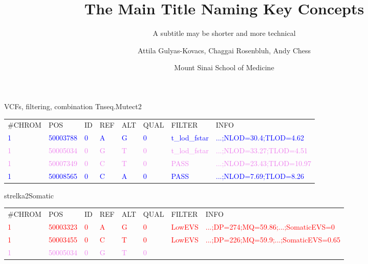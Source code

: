 \documentclass{beamer}
\title{The Main Title Naming Key Concepts}
\subtitle{A subtitle may be shorter and more technical}
\author{Attila Gulyas-Kovacs, Chaggai Rosenbluh, Andy Chess}
\date{Mount Sinai School of Medicine}
\begin{document}
\maketitle

\begin{frame}{VCFs, filtering, combination}
\normalsize
Tnseq.Mutect2
\tiny
\begin{tabular}{llllllll}
\#CHROM & POS & ID & REF & ALT & QUAL & FILTER & INFO \\
\textcolor{blue}{1} &
\textcolor{blue}{50003788} &
\textcolor{blue}{0} &
\textcolor{blue}{A} &
\textcolor{blue}{G} &
\textcolor{blue}{0} &
\textcolor{blue}{t\_lod\_fstar} &
\textcolor{blue}{...;NLOD=30.4;TLOD=4.62} \\
\textcolor{violet}{1} &
\textcolor{violet}{50005034} &
\textcolor{violet}{0} &
\textcolor{violet}{G} &
\textcolor{violet}{T} &
\textcolor{violet}{0} &
\textcolor{violet}{t\_lod\_fstar} &
\textcolor{violet}{...;NLOD=33.27;TLOD=4.51} \\
\textcolor{violet}{1} &
\textcolor{violet}{50007349} &
\textcolor{violet}{0} &
\textcolor{violet}{C} &
\textcolor{violet}{T} &
\textcolor{violet}{0} &
\textcolor{violet}{PASS} &
\textcolor{violet}{...;NLOD=23.43;TLOD=10.97} \\
\textcolor{blue}{1} &
\textcolor{blue}{50008565} &
\textcolor{blue}{0} &
\textcolor{blue}{C} &
\textcolor{blue}{A} &
\textcolor{blue}{0} &
\textcolor{blue}{PASS} &
\textcolor{blue}{...;NLOD=7.69;TLOD=8.26} \\
\end{tabular}
\vfill
\normalsize
strelka2Somatic
\tiny
\begin{tabular}{llllllll}
\#CHROM & POS & ID & REF & ALT & QUAL & FILTER & INFO \\
\textcolor{red}{1} &
\textcolor{red}{50003323} &
\textcolor{red}{0} &
\textcolor{red}{A} &
\textcolor{red}{G} &
\textcolor{red}{0} &
\textcolor{red}{LowEVS} &
\textcolor{red}{...;DP=274;MQ=59.86;...;SomaticEVS=0} \\
\textcolor{red}{1} &
\textcolor{red}{50003455} &
\textcolor{red}{0} &
\textcolor{red}{C} &
\textcolor{red}{T} &
\textcolor{red}{0} &
\textcolor{red}{LowEVS} &
\textcolor{red}{...;DP=226;MQ=59.9;...;SomaticEVS=0.65} \\
\textcolor{violet}{1} &
\textcolor{violet}{50005034} &
\textcolor{violet}{0} &
\textcolor{violet}{G} &
\textcolor{violet}{T} &
\textcolor{violet}{0} &

\end{tabular}
\end{frame}
\end{document}

